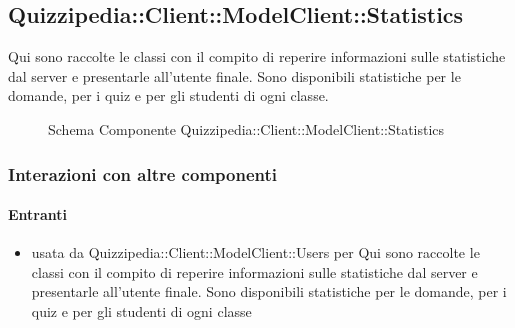 \subsection{Quizzipedia::Client::ModelClient::Statistics}
Qui sono raccolte le classi con il compito di reperire informazioni sulle statistiche dal server e presentarle all'utente finale. Sono disponibili statistiche per le domande, per i quiz e per gli studenti di ogni classe.
\begin{figure}[H]
\centering
\noindent{}
\caption[Schema Componente Quizzipedia::Client::ModelClient::Statistics]{Schema Componente Quizzipedia::Client::ModelClient::Statistics}
\end{figure}
\subsubsection{Interazioni con altre componenti}
\paragraph{Entranti}
\begin{itemize}
\item usata da Quizzipedia::Client::ModelClient::Users per Qui sono raccolte le classi con il compito di reperire informazioni sulle statistiche dal server e presentarle all'utente finale. Sono disponibili statistiche per le domande, per i quiz e per gli studenti di ogni classe
\end{itemize}
